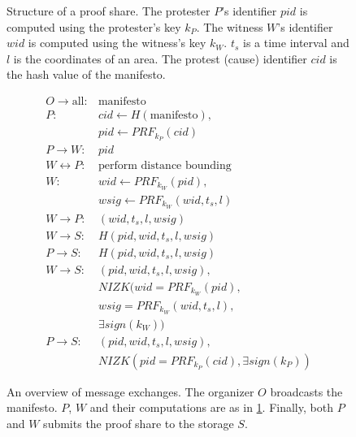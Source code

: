 \begin{columns}[t]
\begin{column}{0.32\linewidth}
\begin{figure}
\begin{tikzpicture}[%
        -Latex,
        item/.style={rectangle,draw},
        edge from parent/.style={},
        ]
      \end{tikzpicture}
      \caption{%
        Structure of a proof share.
        The protester \(P\)'s identifier \(pid\) is computed using the protester's 
        key \(k_P\).
        The witness \(W\)'s identifier \(wid\) is computed using the witness's key 
        \(k_W\).
        \(t_s\) is a time interval and \(l\) is the coordinates of an area.
        The protest (cause) identifier \(cid\) is the hash value of the manifesto.
      }%
      \label{fig:ProofFig}
    \end{figure}%

    \begin{figure}
      \centering
      \begin{minipage}{\linewidth}
        \begin{align*}
          O\to \text{all}\colon & \text{manifesto} \\
          P\colon & cid\gets H(\text{manifesto}), \\
          & pid\gets PRF_{k_P}(cid) \\
          P\to W\colon & pid \\
          W\leftrightarrow P\colon & \text{perform distance bounding} \\
          W\colon & wid\gets PRF_{k_W}(pid), \\
          & wsig\gets PRF_{k_W}(wid, t_s, l) \\
          W\to P\colon & (wid, t_s, l, wsig) \\
          W\to S\colon & H(pid, wid, t_s, l, wsig) \\
          P\to S\colon & H(pid, wid, t_s, l, wsig) \\
          W\to S\colon & (pid, wid, t_s, l, wsig),\\
          & NIZK(wid = PRF_{k_W}(pid), \\
            & wsig = PRF_{k_W}(wid, t_s, l), \\
            & \exists sign(k_W)) \\
          P\to S\colon & (pid, wid, t_s, l, wsig),\\
          & NIZK(pid = PRF_{k_P}(cid), \exists sign(k_P))
        \end{align*}
      \end{minipage}
      \caption{%
        An overview of message exchanges.
        The organizer \(O\) broadcasts the manifesto.
        \(P\), \(W\) and their computations are as in \cref{fig:ProofFig}.
        Finally, both \(P\) and \(W\) submits the proof share to the storage \(S\).
      }%
      \label{fig:ProtocolOverview}
    \end{figure}


\end{column}
\end{columns}
